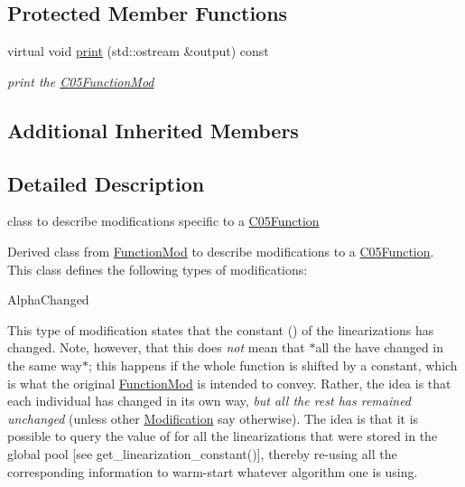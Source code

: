 \subsection*{Protected Member Functions}
\begin{DoxyCompactItemize}
\item 
\mbox{\label{class_s_m_spp__di__unipi__it_1_1_c05_function_mod_a2e7b9c9148a98c5c342e8c25cac95926}} 
virtual void \mbox{\hyperlink{class_s_m_spp__di__unipi__it_1_1_c05_function_mod_a2e7b9c9148a98c5c342e8c25cac95926}{print}} (std\+::ostream \&output) const
\begin{DoxyCompactList}\small\item\em print the \mbox{\hyperlink{class_s_m_spp__di__unipi__it_1_1_c05_function_mod}{C05\+Function\+Mod}} \end{DoxyCompactList}\end{DoxyCompactItemize}
\subsection*{Additional Inherited Members}


\subsection{Detailed Description}
class to describe modifications specific to a \mbox{\hyperlink{class_s_m_spp__di__unipi__it_1_1_c05_function}{C05\+Function}} 

Derived class from \mbox{\hyperlink{class_s_m_spp__di__unipi__it_1_1_function_mod}{Function\+Mod}} to describe modifications to a \mbox{\hyperlink{class_s_m_spp__di__unipi__it_1_1_c05_function}{C05\+Function}}. This class defines the following types of modifications\+:


\begin{DoxyItemize}
\item Alpha\+Changed
\end{DoxyItemize}

This type of modification states that the constant () of the linearizations has changed. Note, however, that this does {\itshape not} mean that $\ast$all the  have changed in the same way$\ast$; this happens if the whole function is shifted by a constant, which is what the original \mbox{\hyperlink{class_s_m_spp__di__unipi__it_1_1_function_mod}{Function\+Mod}} is intended to convey. Rather, the idea is that each individual  has changed in its own way, {\itshape but all the rest has remained unchanged} (unless other \mbox{\hyperlink{class_s_m_spp__di__unipi__it_1_1_modification}{Modification}} say otherwise). The idea is that it is possible to query the value of  for all the linearizations that were stored in the global pool \mbox{[}see get\+\_\+linearization\+\_\+constant()\mbox{]}, thereby re-\/using all the corresponding information to warm-\/start whatever algorithm one is using.

